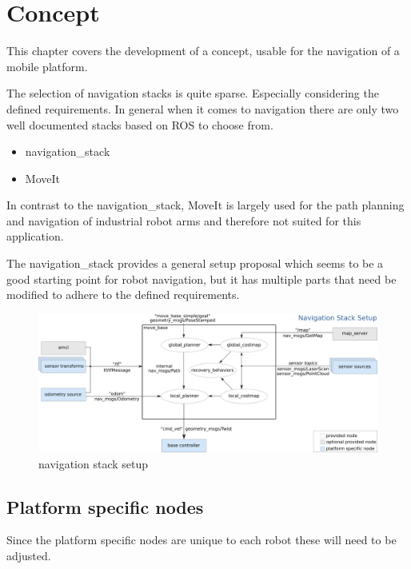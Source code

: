 \chapter{Concept}
\label{Concept}
This chapter covers the development of a concept, usable for the navigation of a mobile platform. 


The selection of navigation stacks is quite sparse. Especially considering the defined requirements. In general when it comes to navigation there are only two well documented stacks based on ROS to choose from.

\begin{itemize}
	\item navigation\_stack
	\item MoveIt
\end{itemize}

In contrast to the navigation\_stack, MoveIt is largely used for the path planning and navigation of industrial robot arms and therefore not suited for this application.

The navigation\_stack provides a general setup proposal which seems to be a good starting point for robot navigation, but it has multiple parts that need be modified to adhere to the defined requirements.

\begin{figure}[H]
	\centering
	\includegraphics[width=\textwidth]{Pictures/navigation stack setup}
	\caption{navigation stack setup\cite{movebase}}
	
	\label{navigation stack setup}
\end{figure}


\section{Platform specific nodes}
Since the platform specific nodes are unique to each robot these will need to be adjusted.\\
